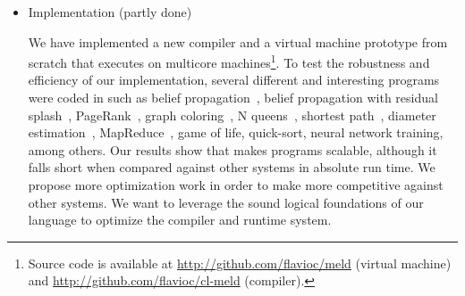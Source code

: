 \begin{itemize}
   \item Implementation (partly done)

   We have implemented a new compiler and a virtual machine prototype from scratch that executes on multicore machines\footnote{Source code is available at \url{http://github.com/flavioc/meld} (virtual machine) and \url{http://github.com/flavioc/cl-meld} (compiler).}.
   To test the robustness and efficiency of our implementation, several different
   and interesting programs were coded in \lang such as belief propagation~\cite{Gonzalez+al:aistats09paraml},
   belief propagation with residual splash~\cite{Gonzalez+al:aistats09paraml}, PageRank~\cite{Page:2001:MNR},
   graph coloring~\cite{PSP:2032868}, N queens~\cite{8queens}, shortest path~\cite{Dijkstra}, diameter estimation~\cite{5234320}, MapReduce~\cite{Dean:2008:MSD:1327452.1327492}, game of life, quick-sort, neural network training, among others. Our results show that \lang makes programs scalable, although it falls short when compared against other systems in absolute run time. We propose more optimization work
   in order to make \lang more competitive against other systems. We want to leverage the sound logical
   foundations of our language to optimize the compiler and runtime system.
   
\end{itemize}